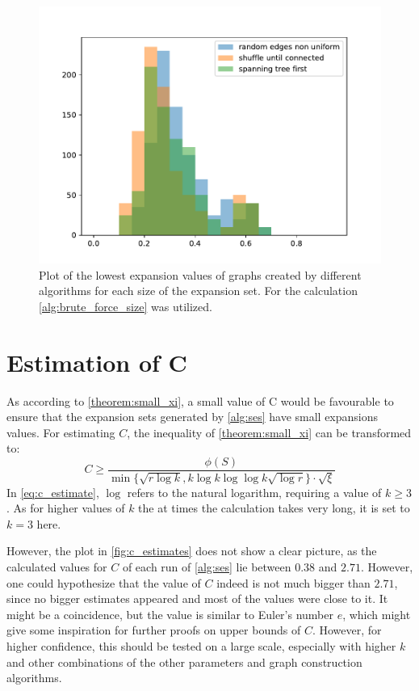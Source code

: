 \begin{figure}
	\centering
	\includegraphics[scale=1]{figures/creation_algorithm_log_lowest_expansion.pdf}
	\caption[Plot lowest expansion for different algorithms]{Plot of the lowest expansion values of graphs created by different algorithms for each size of the expansion set. For the calculation \cref{alg:brute_force_size} was utilized.\label{fig:plot_lowest_expansion_each_size}}
\end{figure}

\section{Estimation of C}
As according to \cref{theorem:small_xi}, a small value of C would be favourable to ensure that the expansion sets generated by \cref{alg:ses} have small expansions values. 
For estimating $C$, the inequality of \cref{theorem:small_xi} can be transformed to:
\begin{equation} \label{eq:c_estimate}
C\ge \frac {\phi(S)}{ \min\{\sqrt{r \log k}, k \log k  \log \log k \sqrt{\log r} \} \cdot \sqrt{\xi}}
\end{equation} In \cref{eq:c_estimate}, $\log$ refers to the natural logarithm, requiring a value of $k\ge3$. As for higher values of $k$ the at times the calculation takes very long, it is set to $k=3$ here.


However, the plot in \cref{fig:c_estimates} does not show a clear picture, as the calculated values for $ C$ of each run of \cref{alg:ses} lie between $0.38$ and $2.71$. However, one could hypothesize that the value of $C$ indeed is not much bigger than $2.71$, since no bigger estimates appeared and most of the values were close to it. It might be a coincidence, but the value is similar to Euler's number $e$, which might give some inspiration for further proofs on upper bounds of $C$. 
However, for higher confidence, this should be tested on a large scale, especially with higher $k$ and other combinations of the other parameters and graph construction algorithms.


